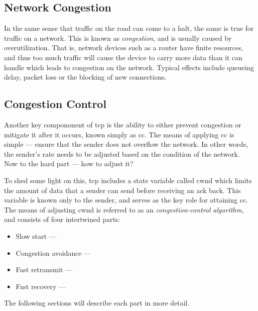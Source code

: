\subsection{Network Congestion}

In the same sense that traffic on the road can come to a halt, the same is true for traffic on a network. This is known as \textit{congestion}, and is usually caused by overutilization. That is, network devices such as a router have finite resources, and thus too much traffic will cause the device to carry more data than it can handle which leads to congestion on the network. Typical effects include queueing delay, packet loss or the blocking of new connections.







\subsection{Congestion Control}

Another key compononent of \gls{tcp} is the ability to either prevent congestion or mitigate it after it occurs, known simply as \gls{cc}. The means of applying \gls{cc} is simple --- ensure that the sender does not overflow the network. In other words, the sender's rate needs to be adjusted based on the condition of the network. Now to the hard part --- how to adjust it?

To shed some light on this, \gls{tcp} includes a state variable called \gls{cwnd} which limits the amount of data that a sender can send before receiving an \gls{ack} back. This variable is known only to the sender, and serves as the key role for attaining \gls{cc}. The means of adjusting \gls{cwnd} is referred to as an \textit{congestion-control algorithm}, and consists of four intertwined parts:

\begin{itemize}
    \item Slow start ---
    \item Congestion avoidance ---
    \item Fast retransmit ---
    \item Fast recovery ---
\end{itemize}

The following sections will describe each part in more detail.





